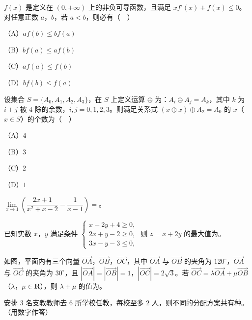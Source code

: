 \begin{question}
$f(x)$ 是定义在 $(0,+\infty)$ 上的非负可导函数，且满足 $xf'(x)+f(x)\leqslant0$。对任意正数 $a$，$b$，若 $a<b$，则必有（　）

（A）$af(b)\leqslant bf(a)$

（B）$bf(a)\leqslant af(b)$

（C）$af(a)\leqslant f(b)$

（D）$bf(b)\leqslant f(a)$

\end{question}
\begin{question}
设集合 $S=\{A_0,A_1,A_2,A_3\}$，在 $S$ 上定义运算 $\oplus$ 为：$A_i\oplus A_j=A_k$，其中 $k$ 为 $i+j$ 被 $4$ 除的余数，$i,j=0,1,2,3$。则满足关系式 $(x\oplus x)\oplus A_2=A_0$ 的 $x$（$x\in S$）的个数为（　）

（A）$4$

（B）$3$

（C）$2$

（D）$1$

\end{question}

\begin{question}
$\lim\limits_{x\to1}\left(\dfrac{2x+1}{x^2+x-2}-\dfrac1{x-1}\right)=$\gkblank{}。

\end{question}
\begin{question}
已知实数 $x$，$y$ 满足条件 $\begin{cases}x-2y+4\geqslant0,\\ 2x+y-2\geqslant0,\\ 3x-y-3\leqslant0,\end{cases}$ 则 $z=x+2y$ 的最大值为\gkblank{}。

\Needspace{0.4\textheight}
\end{question}
\begin{question}
如图，平面内有三个向量 $\overrightarrow{OA}$，$\overrightarrow{OB}$，$\overrightarrow{OC}$，其中 $\overrightarrow{OA}$ 与 $\overrightarrow{OB}$ 的夹角为 $120^\circ$，$\overrightarrow{OA}$ 与 $\overrightarrow{OC}$ 的夹角为 $30^\circ$，且 $|\overrightarrow{OA}|=|\overrightarrow{OB}|=1$，$|\overrightarrow{OC}|=2\sqrt3$。若 $\overrightarrow{OC}=\lambda\overrightarrow{OA}+\mu\overrightarrow{OB}$（$\lambda$，$\mu\in\mathbf R$），则 $\lambda+\mu$ 的值为\gkblank{}。
\nopagebreak[4]
\begin{center}\end{center}
\nopagebreak[4]
\end{question}
\begin{question}
安排 $3$ 名支教教师去 $6$ 所学校任教，每校至多 $2$ 人，则不同的分配方案共有\gkblank{}种。（用数字作答）

\end{question}

